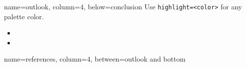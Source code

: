 \documentclass[
	fontsize=26pt,%
	paperwidth=48in,%
	paperheight=36in,%
]{stellarex-poster}
\begin{document}
\begin{tcbposter}[
	poster={
		columns=4,%
		rows=4,%
	}]
\begin{posterboxenv}[
	title=Outlook,
	highlight=blue,%
	]{name=outlook, column=4, below=conclusion}
	Use \verb+highlight=<color>+ for any palette color.
	\begin{itemize}
		\item \lipsum[10][1]
		\item \lipsum[10][3]
	\end{itemize}
\end{posterboxenv}

\begin{posterboxenv}[title=References]{name=references, column=4, between=outlook and bottom}
	\nocite{*}%
	\printbibliography[heading=none]
\end{posterboxenv}

\end{tcbposter}
\end{document}
